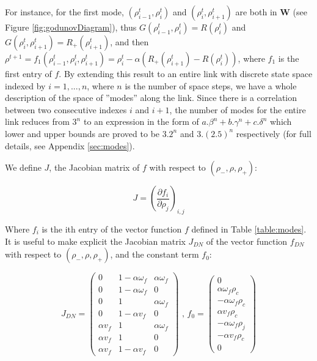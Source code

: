 \documentclass[11pt]{article}
\numberwithin{equation}{section}
\numberwithin{figure}{section}
\numberwithin{table}{section}
\begin{document}
For instance, for the first mode, $(\rho^{t}_{i-1}, \rho^{t}_{i})$ and $(\rho^{t}_{i}, \rho^{t}_{i+1})$ are both in \textbf{W} (see Figure \ref{fig:godunovDiagram}), thus $G(\rho^{t}_{i-1}, \rho^{t}_{i}) = R(\rho^{t}_{i})$ and $G(\rho^{t}_{i}, \rho^{t}_{i+1}) = R_{+}(\rho^{t}_{i+1})$, and then $\rho^{t+1} = f_{1}(\rho^{t}_{i-1},\rho^{t}_{i},\rho^{t}_{i+1}) = \rho^{t}_{i} - \alpha(R_{+}(\rho^{t}_{i+1})-R(\rho^{t}_{i}))$, where $f_{1}$ is the first entry of $f$. By extending this result to an entire link with discrete state space indexed by $i = 1,...,n$, where $n$ is the number of space steps, we have a whole description of the space of ''modes'' along the link. Since there is a correlation between two consecutive indexes $i$ and $i+1$, the number of modes for the entire link reduces from $3^{n}$ to an expression in the form of $a.\beta^{n} + b.\gamma^{n} + c.\delta^{n}$ which lower and upper bounds are proved to be $3.2^{n}$ and $3.(2.5)^{n}$ respectively (for full details, see Appendix \ref{sec:modes}). 

We define $J$, the Jacobian matrix of $f$ with respect to $(\rho_{-},\rho,\rho_{+})$:

\begin{equation}\label{eq:jacobian}
J = \left(\frac{\partial f_{i}}{\partial \rho_{j}}\right)_{i,j}
\end{equation}

\noindent Where $f_{i}$ is the ith entry of the vector function $f$ defined in Table \ref{table:modes}. It is useful to make explicit the Jacobian matrix $J_{DN}$ of the vector function $f_{DN}$ with respect to $(\rho_{-},\rho,\rho_{+})$, and the constant term $f_{0}$:

\begin{equation} \label{eq:jacobianDN}
J_{DN} = \left( \begin{array}{ccc}
0 & 1 - \alpha \omega_{f} & \alpha \omega_{f} \\
0 & 1 - \alpha \omega_{f} & 0 \\
0 & 1 & \alpha \omega_{f} \\
0 &  1 - \alpha v_{f} & 0 \\
\alpha v_{f} & 1 & \alpha \omega_{f} \\
\alpha v_{f} & 1 & 0 \\
\alpha v_{f} & 1 - \alpha v_{f} & 0
\end{array} \right)
\text{ ,   }
f_{0} = \left( \begin{array}{c}
0 \\
\alpha \omega_{f} \rho_{c}\\
-\alpha \omega_{f} \rho_{c}\\
\alpha v_{f} \rho_{c}\\
-\alpha \omega_{f} \rho_{j}\\
-\alpha v_{f} \rho_{c}\\
0
\end{array} \right)
\end{equation}
\end{document}

